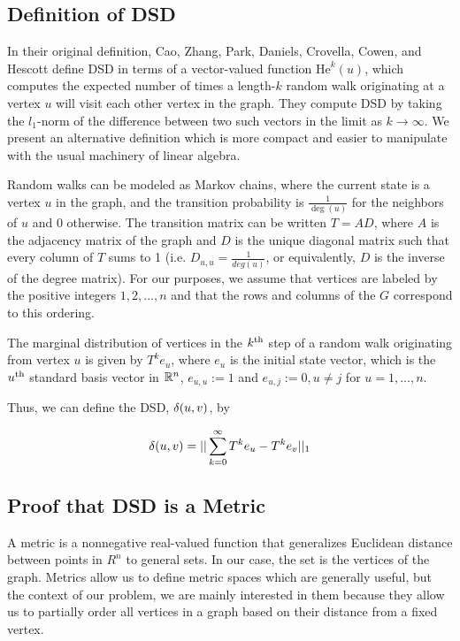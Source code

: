 \subsection*{Definition of DSD}

\noindent In their original definition, Cao, Zhang, Park, Daniels, Crovella, Cowen, and Hescott define
DSD in terms of a vector-valued function $\mathrm{He}^{k}(u)$, which computes the expected number of
times a length-$k$ random walk originating at a vertex $u$ will visit each other vertex in the graph.
They compute DSD by taking the $l_1$-norm of the difference between two such vectors in the limit as
$k \to \infty$. We present an alternative definition which is more compact and easier to manipulate
with the usual machinery of linear algebra.


Random walks can be modeled as Markov chains, where the current state is a
vertex $u$ in the graph, and the transition probability is $\frac{1}{\deg(u)}$
for the neighbors of $u$ and $0$ otherwise. The transition matrix can be written
$T = AD$, where $A$ is the adjacency matrix of the graph and $D$ is the unique
diagonal matrix such that every column of $T$ sums to 1 (i.e.
$D_{u,u}=\frac{1}{deg(u)}$, or equivalently, $D$ is the inverse of the degree
matrix). For our purposes, we assume that vertices are labeled by the positive
integers $1,2,...,n$ and that the rows and columns of the $G$ correspond to this
ordering.

The marginal distribution of vertices in the $k^{\mathrm{th}}$ step of a random walk
originating from vertex $u$ is given by $T^ke_u$, where $e_u$ is the initial
state vector, which is the $u^{\mathrm{th}}$ standard basis vector in $\mathbb{R}^n$,
$e_{u,u} := 1$ and $e_{u,j} := 0, u \neq j$ for $u=1,...,n$.

Thus, we can define the DSD, $\delta(u,v)$, by

\[
  \delta(u,v) = ||\sum_{k =0}^{\infty}{T^ke_u - T^ke_v}||_1
\]

\subsection{Proof that DSD is a Metric}

A metric is a nonnegative real-valued function that generalizes Euclidean
distance between points in $R^n$ to general sets. In our case, the set is the
vertices of the graph. Metrics allow us to define metric spaces which are
generally useful, but the context of our problem, we are mainly interested in
them because they allow us to partially order all vertices in a graph based on
their distance from a fixed vertex.


